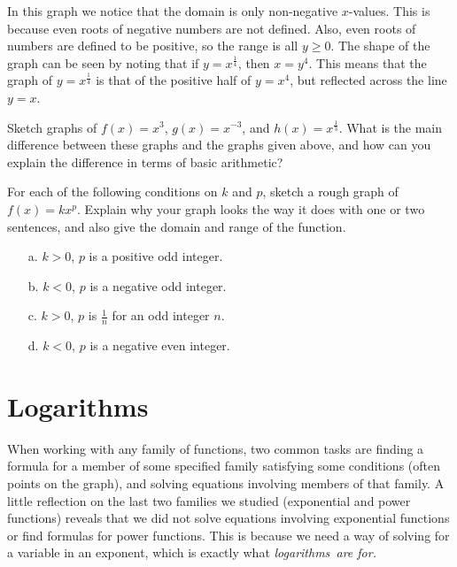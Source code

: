 \begin{eg}
\pagebreak

In this graph we notice that the domain is only non-negative $x$-values. This is because even roots of negative numbers are not defined. Also, even roots of numbers are defined to be positive, so the range is all $y \geq 0$. The shape of the graph can be seen by noting that if $y=x^{\frac{1}{4}}$, then $x=y^4$. This means that the graph of $y=x^{\frac{1}{4}}$ is that of the positive half of $y=x^{4}$, but reflected across the  line $y=x$.

\begin{question} Sketch graphs of $f(x) = x^{3}$, $g(x) = x^{-3}$, and $h(x) = x^{\frac{1}{3}}$. What is the main difference between these graphs and the graphs given above, and how can you explain the difference in terms of basic arithmetic?
\end{question}

\begin{question} For each of the following conditions on $k$ and $p$, sketch a rough graph of $f(x) = kx^{p}$. Explain why your graph looks the way it does with one or two sentences, and also give the domain and range of the function.

\begin{enumerate}
\item[a.] $k>0$, $p$ is a positive odd integer.
\item[b.] $k<0$, $p$ is a negative odd integer.
\item[c.] $k>0$, $p$ is $\frac{1}{n}$ for an odd integer $n$.
\item[d.] $k<0$, $p$ is a negative even integer. 
\end{enumerate}
\end{question}


\section{Logarithms}

When working with any family of functions, two common tasks are finding a formula for a member of some specified family satisfying some conditions (often points on the graph), and solving equations involving members of that family. A little reflection on the last two families we studied (exponential and power functions) reveals that we did not solve equations involving exponential functions or find formulas for power functions. This is because we need a way of solving for a variable in an exponent, which is exactly what \it{logarithms}\ \normalfont are for.


\end{eg}

